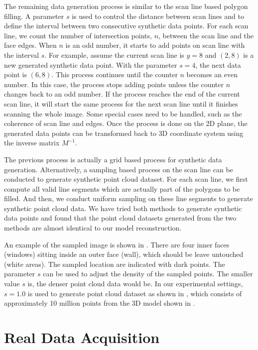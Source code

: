 The remaining data generation process is similar to
the scan line based polygon filling.
A parameter $s$ is used to control the distance
between scan lines and to define the interval
between two consecutive synthetic data points.
For each scan line, we count the number of intersection points, $n$,
between the scan line and the face edges.
When $n$ is an odd number,
it starts to add points on scan line with the interval $s$.
For example, assume the current scan line is $y = 8$
and $(2, 8)$ is a new generated synthetic data point.
With the parameter $s = 4$, the next data point is $(6, 8)$.
This process continues until the counter $n$ becomes an even number.
In this case, the process stops adding points unless
the counter $n$ changes back to an odd number.
If the process reaches the end of the current scan line,
it will start the same process for the next scan line
until it finishes scanning the whole image.
Some special cases need to be handled, such as the coherence
of scan line and edges.
Once the process is done on the 2D plane,
the generated data points can be transformed back to
3D coordinate system using the inverse matrix $M^{-1}$.

The previous process is actually a grid based process
 for synthetic data generation.
Alternatively, a sampling based process on the scan line can be conducted
to generate synthetic point cloud dataset.
For each scan line, we first compute all valid line segments
which are actually part of the polygons to be filled.
And then, we conduct uniform sampling on these line segments
to generate synthetic point cloud data.
We have tried both methods to generate synthetic data points
and found that the point cloud datasets generated
from the two methods are almost identical to our model reconstruction.

An example of the sampled image is shown in .
There are four inner faces (windows) sitting inside an outer face (wall),
which should be leave untouched (white areas).
The sampled location are indicated with dark points.
The parameter $s$ can be used to adjust the density of the sampled points.
The smaller value $s$ is, the denser point cloud data would be.
In our experimental settings, $s=1.0$ is used to generate
point cloud dataset as shown in , which
consists of approximately 10 million points from the 3D model
shown in .

\section{Real Data Acquisition}
\label{sec:dg_rda}

